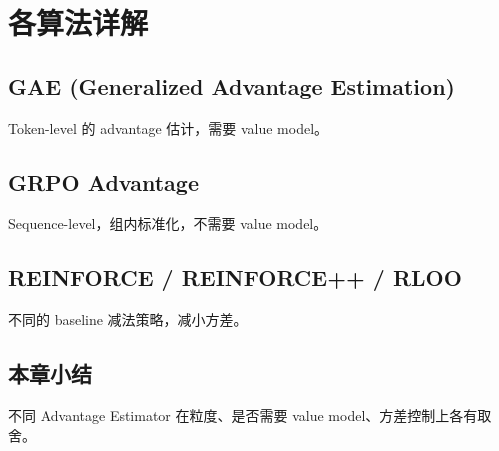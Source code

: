 \section{各算法详解}
\subsection{GAE (Generalized Advantage Estimation)}
Token-level 的 advantage 估计，需要 value model。

\subsection{GRPO Advantage}
Sequence-level，组内标准化，不需要 value model。

\subsection{REINFORCE / REINFORCE++ / RLOO}
不同的 baseline 减法策略，减小方差。

\subsection{本章小结}
不同 Advantage Estimator 在粒度、是否需要 value model、方差控制上各有取舍。

\newpage
